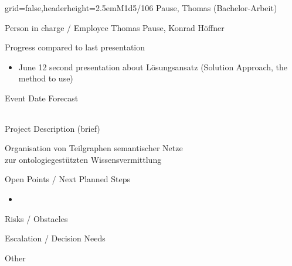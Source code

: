 \documentclass[english]{kiesgrube}
\begin{document}
\begin{poster}{grid=false,headerheight=2.5em}{}{M1d5/106 Pause, Thomas (Bachelor-Arbeit)}{}{}
\begin{posterbox}[name=person,column=0,row=0]{Person in charge / Employee}
Thomas Pause, Konrad Höffner
\end{posterbox}
\begin{posterbox}[name=progress,below=person]{Progress compared to last presentation}
\begin{itemize}
\item June 12 second presentation about Lösungsansatz (Solution Approach, the method to use)
\end{itemize}
\end{posterbox}
\begin{posterbox}[name=event,below=progress]{Event Date Forecast}
\begin{tabulary}{\textwidth}{lL}
\end{tabulary}
\end{posterbox}
\begin{posterbox}[name=description,column=1,row=0]{Project Description (brief)}
\begin{center}
Organisation von Teilgraphen semantischer Netze\\
zur ontologiegestützten Wissensvermittlung
\end{center}
\end{posterbox}
\begin{posterbox}[name=open,column=1,below=description]{Open Points / Next Planned Steps}
\begin{itemize}
\item 
\end{itemize}
\end{posterbox}
\begin{posterbox}[name=risks,column=1,below=open]{Risks / Obstacles}
\end{posterbox}
\begin{posterbox}[name=escalation,column=1,below=risks]{Escalation / Decision Needs}
\end{posterbox}
\begin{posterbox}[name=other,column=1,below=escalation]{Other}
\end{posterbox}
\footer{}
\end{poster}
\end{document}

